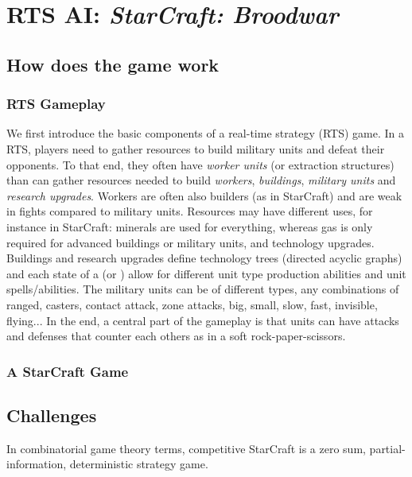 \chapter{RTS AI: \textit{StarCraft: Broodwar}}

\section{How does the game work}

\subsection{RTS Gameplay}
We first introduce the basic components of a real-time strategy (RTS) game. In a RTS, players need to gather resources to build military units and defeat their opponents. To that end, they often have \textit{worker units} (or extraction structures) than can gather resources needed to build \textit{workers}, \textit{buildings}, \textit{military units} and \textit{research upgrades}. Workers are often also builders (as in StarCraft) and are weak in fights compared to military units. Resources may have different uses, for instance in StarCraft: minerals are used for everything, whereas gas is only required for advanced buildings or military units, and technology upgrades. Buildings and research upgrades define technology trees (directed acyclic graphs) and each state of a  (or ) allow for different unit type production abilities and unit spells/abilities. The military units can be of different types, any combinations of ranged, casters, contact attack, zone attacks, big, small, slow, fast, invisible, flying... In the end, a central part of the gameplay is that units can have attacks and defenses that counter each others as in a soft rock-paper-scissors. 

\subsection{A StarCraft Game}


\section{Challenges}
In combinatorial game theory terms, competitive StarCraft is a zero sum, partial-information, deterministic strategy game.

